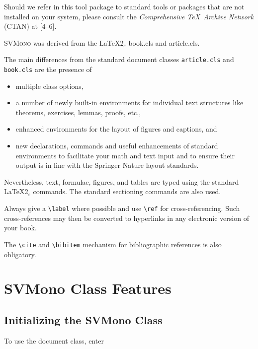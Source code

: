 \documentclass[graybox,square]{svmono}
\begin{document}
\begin{sloppy}
Should we refer in this tool package to standard tools or packages that are not installed on your system, please consult the \textit{Comprehensive \TeX\ Archive Network} (CTAN) at [4--6].

\textsc{SVMono} was derived from the \LaTeX2$_{\varepsilon}$ book.cls and article.cls.

\pagebreak

The main differences from the standard document classes \verb|article.cls| and \verb|book.cls| are the presence of
\begin{itemize}
\item multiple class options,
\item a number of newly built-in environments for individual text structures like theorems, exercises, lemmas, proofs, etc.,
\item enhanced environments for the layout of figures and captions, and
\item new declarations, commands and useful enhancements of standard environments to facilitate your math and text input and to ensure their output is in line with the Springer Nature layout standards.
\end{itemize}%


Nevertheless, text, formulae, figures, and tables are typed using the standard \LaTeX2$_{\varepsilon}$ commands. The standard sectioning commands are also used.
%

Always give a \verb|\label| where possible and use \verb|\ref| for cross-referencing. Such cross-references may then be converted to hyperlinks in any electronic version of your book.
%

The \verb|\cite| and \verb|\bibitem| mechanism for bibliographic references is also obligatory.

\enlargethispage{5pt}

\vspace*{-6pt}

\section{SVMono Class Features}\label{sec:2}

\subsection{Initializing the SVMono Class}\label{subsec:1}
To use the document class, enter

\cprotect{}



\end{sloppy}
\end{document}
